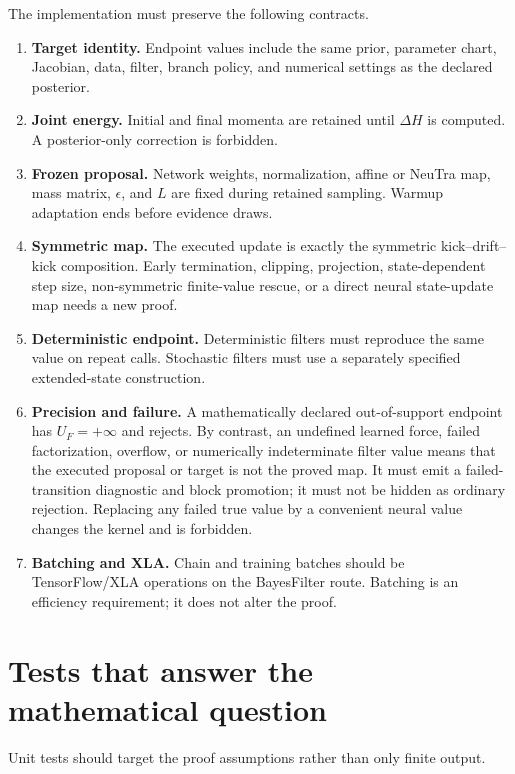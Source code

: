 The implementation must preserve the following contracts.
\begin{enumerate}
 \item \textbf{Target identity.}  Endpoint values include the same prior,
 parameter chart, Jacobian, data, filter, branch policy, and numerical settings
 as the declared posterior.
 \item \textbf{Joint energy.}  Initial and final momenta are retained until
 $\Delta H$ is computed.  A posterior-only correction is forbidden.
 \item \textbf{Frozen proposal.}  Network weights, normalization, affine or
 NeuTra map, mass matrix, $\epsilon$, and $L$ are fixed during retained
 sampling.  Warmup adaptation ends before evidence draws.
 \item \textbf{Symmetric map.}  The executed update is exactly the symmetric
 kick--drift--kick composition.  Early termination, clipping, projection,
 state-dependent step size, non-symmetric finite-value rescue, or a direct
 neural state-update map needs a new proof.
 \item \textbf{Deterministic endpoint.}  Deterministic filters must reproduce
 the same value on repeat calls.  Stochastic filters must use a separately
 specified extended-state construction.
 \item \textbf{Precision and failure.}  A mathematically declared
 out-of-support endpoint has $U_F=+\infty$ and rejects.  By contrast, an
 undefined learned force, failed factorization, overflow, or numerically
 indeterminate filter value means that the executed proposal or target is not
 the proved map.  It must emit a failed-transition diagnostic and block
 promotion; it must not be hidden as ordinary rejection.  Replacing any failed
 true value by a convenient neural value changes the kernel and is forbidden.
 \item \textbf{Batching and XLA.}  Chain and training batches should be
 TensorFlow/XLA operations on the BayesFilter route.  Batching is an efficiency
 requirement; it does not alter the proof.
\end{enumerate}

\section{Tests that answer the mathematical question}
\label{sec:bf-hnn-tests}

Unit tests should target the proof assumptions rather than only finite output.

